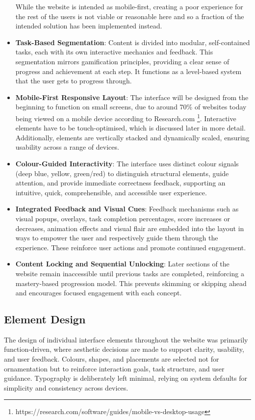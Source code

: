 \begin{itemize}
    While the website is intended as mobile-first, creating a poor experience for the rest of the users is not viable or reasonable here and so a fraction of the intended solution has been implemented instead.
    \item \textbf{Task-Based Segmentation}: Content is divided into modular, self-contained tasks, each with its own interactive mechanics and feedback. 
    This segmentation mirrors gamification principles, providing a clear sense of progress and achievement at each step. 
    It functions as a level-based system that the user gets to progress through.
    \item \textbf{Mobile-First Responsive Layout}: The interface will be designed from the beginning to function on small screens, due to around 70\% of websites today being viewed on a mobile device according to Research.com \footnote{https://research.com/software/guides/mobile-vs-desktop-usage}. 
    Interactive elements have to be touch-optimised, which is discussed later in more detail. 
    Additionally, elements are vertically stacked and dynamically scaled, ensuring usability across a range of devices.
    \item \textbf{Colour-Guided Interactivity}:  The interface uses distinct colour signals (deep blue, yellow, green/red) to distinguish structural elements, guide attention, and provide immediate correctness feedback, supporting an intuitive, quick, comprehensible, and accessible user experience.
    \item \textbf{Integrated Feedback and Visual Cues}:  Feedback mechanisms such as visual popups, overlays, task completion percentages, score increases or decreases, animation effects and visual flair are embedded into the layout in ways to empower the user and respectively guide them through the experience. 
    These reinforce user actions and promote continued engagement.
    \item \textbf{Content Locking and Sequential Unlocking}:  Later sections of the website remain inaccessible until previous tasks are completed, reinforcing a mastery-based progression model. 
    This prevents skimming or skipping ahead and encourages focused engagement with each concept. 
\end{itemize}

\subsection{Element Design}
The design of individual interface elements throughout the website was primarily function-driven, where aesthetic decisions are made to support clarity, usability, and user feedback. 
Colours, shapes, and placements are selected not for ornamentation but to reinforce interaction goals, task structure, and user guidance. 
Typography is deliberately left minimal, relying on system defaults for simplicity and consistency across devices.

